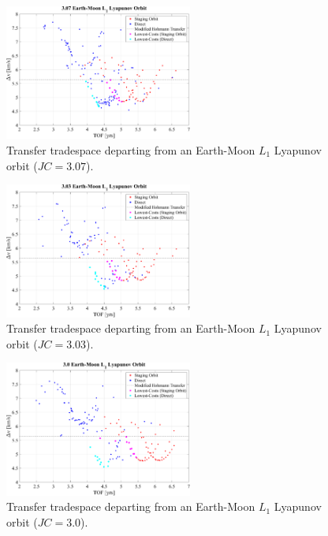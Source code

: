 \begin{figure}[ht]
    \centering
    \includegraphics[width=0.55\textwidth]{figures/TradeSpace_L1Lyapunov_3_07.pdf}
    \caption{Transfer tradespace departing from an Earth-Moon $L_{1}$ Lyapunov orbit ($JC=3.07$).}
\end{figure}

\begin{figure}[ht]
    \centering
    \includegraphics[width=0.55\textwidth]{figures/TradeSpace_L1Lyapunov_3_03.pdf}
    \caption{Transfer tradespace departing from an Earth-Moon $L_{1}$ Lyapunov orbit ($JC=3.03$).}
\end{figure}

\begin{figure}[ht]
    \centering
    \includegraphics[width=0.55\textwidth]{figures/TradeSpace_L1Lyapunov_3_00.pdf}
    \caption{Transfer tradespace departing from an Earth-Moon $L_{1}$ Lyapunov orbit ($JC=3.0$).}
\end{figure}

